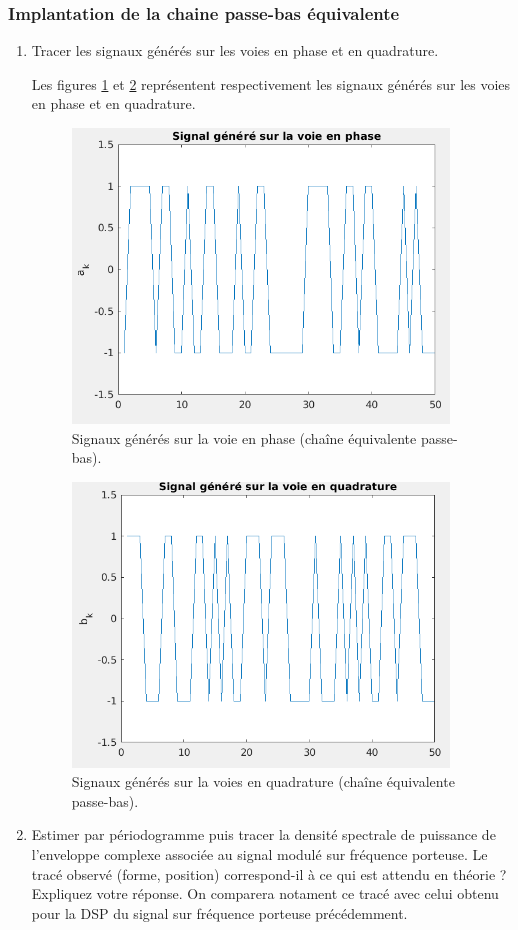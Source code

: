 \documentclass[frenchb]{article}
\begin{document}
\subsubsection{Implantation de la chaine passe-bas équivalente}
\begin{enumerate}
    \item Tracer les signaux générés sur les voies en phase et en quadrature.
    
    \par\leavevmode\par
    \setlength\parindent{0.5cm}
    Les figures \ref{F21} et \ref{F211} représentent respectivement  les signaux générés sur les voies en phase et en quadrature. 
    \begin{figure}[ht!]
    		\centering
		\includegraphics[width=10cm]{C1phase.png}	              	 	\caption{Signaux générés sur la voie en phase (chaîne équivalente passe-bas). \label{F21}}
	\end{figure}
	
	\begin{figure}[ht!]
    		\centering
		\includegraphics[width=10cm]{C1quadra.png}	              	 	\caption{Signaux générés sur la voies en quadrature (chaîne équivalente passe-bas). \label{F211}}
	\end{figure}
	\newpage
    \item Estimer par périodogramme puis tracer la densité spectrale de puissance de l'enveloppe complexe associée au signal modulé sur fréquence porteuse. Le tracé observé (forme, position) correspond-il à ce qui est attendu en théorie ? Expliquez votre réponse. On comparera notament ce tracé avec celui obtenu pour la DSP du signal sur fréquence porteuse précédemment.
    

\end{enumerate}
\end{document}
